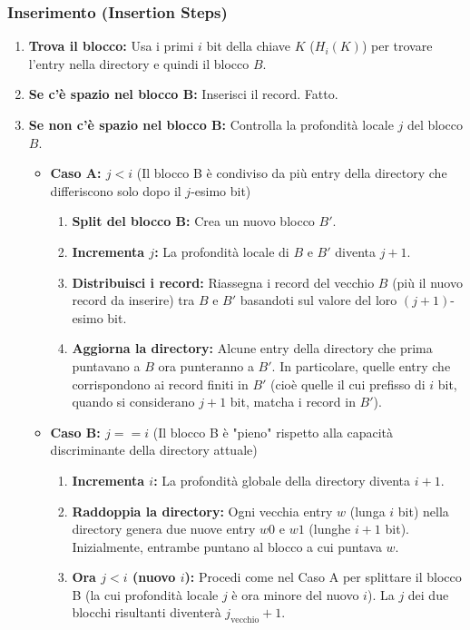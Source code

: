 \subsubsection{Inserimento (Insertion Steps)}
\begin{enumerate}
    \item \textbf{Trova il blocco:} Usa i primi $i$ bit della chiave $K$ ($H_i(K)$) per trovare l'entry nella directory e quindi il blocco $B$.
    \item \textbf{Se c'è spazio nel blocco B:} Inserisci il record. Fatto.
    \item \textbf{Se non c'è spazio nel blocco B:} Controlla la profondità locale $j$ del blocco $B$.
    \begin{itemize}
        \item \textbf{Caso A: $j < i$} (Il blocco B è condiviso da più entry della directory che differiscono solo dopo il $j$-esimo bit)
        \begin{enumerate}
            \item \textbf{Split del blocco B:} Crea un nuovo blocco $B'$.
            \item \textbf{Incrementa $j$:} La profondità locale di $B$ e $B'$ diventa $j+1$.
            \item \textbf{Distribuisci i record:} Riassegna i record del vecchio $B$ (più il nuovo record da inserire) tra $B$ e $B'$ basandoti sul valore del loro $(j+1)$-esimo bit.
            \item \textbf{Aggiorna la directory:} Alcune entry della directory che prima puntavano a $B$ ora punteranno a $B'$. In particolare, quelle entry che corrispondono ai record finiti in $B'$ (cioè quelle il cui prefisso di $i$ bit, quando si considerano $j+1$ bit, matcha i record in $B'$).
        \end{enumerate}
        \item \textbf{Caso B: $j == i$} (Il blocco B è "pieno" rispetto alla capacità discriminante della directory attuale)
        \begin{enumerate}
            \item \textbf{Incrementa $i$:} La profondità globale della directory diventa $i+1$.
            \item \textbf{Raddoppia la directory:} Ogni vecchia entry $w$ (lunga $i$ bit) nella directory genera due nuove entry $w0$ e $w1$ (lunghe $i+1$ bit). Inizialmente, entrambe puntano al blocco a cui puntava $w$.
            \item \textbf{Ora $j < i$ (nuovo $i$):} Procedi come nel Caso A per splittare il blocco B (la cui profondità locale $j$ è ora minore del nuovo $i$). La $j$ dei due blocchi risultanti diventerà $j_{\text{vecchio}}+1$.
        \end{enumerate}
    \end{itemize}
\end{enumerate}

